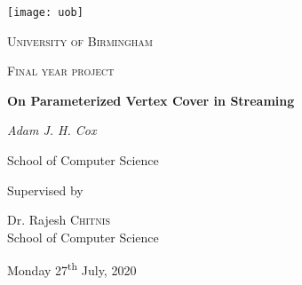 \begin{titlepage}

    \thispagestyle{empty}
    \setlength\headheight{0pt}
    \begin{center}

        \center\texttt{[image: uob]}

        \vspace{0.25cm}
        {\scshape\LARGE University of Birmingham \par}
        \vspace{0.25cm}
        {\scshape\Large Final year project\par}
        \vspace{0.5cm}

        {\Large\bfseries On Parameterized Vertex Cover in Streaming\par}

        \vspace{0.5cm}
        {\Large\itshape Adam J. H. Cox\par}
        School of Computer Science
        \vspace{0.25cm}

        \vspace{1cm}
        Supervised by\par
        Dr. Rajesh \textsc{Chitnis} \\
        School of Computer Science\par
        \vspace{1.5cm}
        \large
        Monday 27\textsuperscript{th} July, 2020

    \end{center}

    \clearpage
    \restoregeometry
\end{titlepage}
